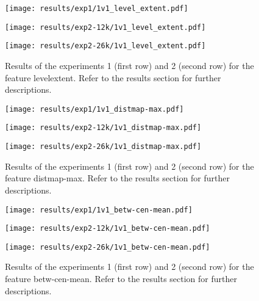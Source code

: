  
\begin{figure}[h!]
    \centering
	\begin{minipage}{0.3\linewidth}
		\texttt{[image: results/exp1/1v1\_level\_extent.pdf]}
	\end{minipage}

	\begin{minipage}{0.3\linewidth}
		\texttt{[image: results/exp2-12k/1v1\_level\_extent.pdf]}
	\end{minipage}
	\begin{minipage}{0.3\linewidth}
		\texttt{[image: results/exp2-26k/1v1\_level\_extent.pdf]}
	\end{minipage}

	\caption[ Results: Feature level\textunderscore extent]{ Results of the experiments 1 (first row) and 2 (second row) for the feature level\textunderscore extent. Refer to the results section for further descriptions. }
	\label{fig:appendix_level_extent}
\end{figure}
 
\begin{figure}[h!]
    \centering
	\begin{minipage}{0.3\linewidth}
		\texttt{[image: results/exp1/1v1\_distmap-max.pdf]}
	\end{minipage}

	\begin{minipage}{0.3\linewidth}
		\texttt{[image: results/exp2-12k/1v1\_distmap-max.pdf]}
	\end{minipage}
	\begin{minipage}{0.3\linewidth}
		\texttt{[image: results/exp2-26k/1v1\_distmap-max.pdf]}
	\end{minipage}

	\caption[ Results: Feature distmap-max]{ Results of the experiments 1 (first row) and 2 (second row) for the feature distmap-max. Refer to the results section for further descriptions. }
	\label{fig:appendix_distmap-max}
\end{figure}
 \newpage 

 
\begin{figure}[h!]
    \centering
	\begin{minipage}{0.3\linewidth}
		\texttt{[image: results/exp1/1v1\_betw-cen-mean.pdf]}
	\end{minipage}

	\begin{minipage}{0.3\linewidth}
		\texttt{[image: results/exp2-12k/1v1\_betw-cen-mean.pdf]}
	\end{minipage}
	\begin{minipage}{0.3\linewidth}
		\texttt{[image: results/exp2-26k/1v1\_betw-cen-mean.pdf]}
	\end{minipage}

	\caption[ Results: Feature betw-cen-mean]{ Results of the experiments 1 (first row) and 2 (second row) for the feature betw-cen-mean. Refer to the results section for further descriptions. }
	\label{fig:appendix_betw-cen-mean}
\end{figure}
 
